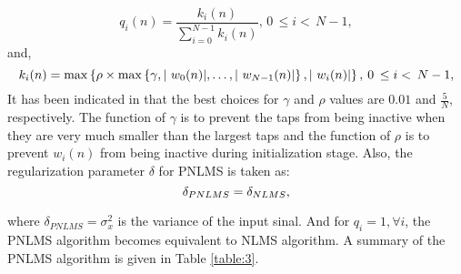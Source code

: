 \vspace{-1.5cm}
\begin{equation}
q_i(n)=\frac{k_{i}(n)}{\sum\limits_{i=0}^{N-1}k_{i}(n)}, \hspace{2pt}0\hspace{2pt}\leq i<\hspace{2pt}N-1, \label{eq12b}
\end{equation}
\noindent and,
\vspace{-0.6cm}
\begin{equation}
k_i(n)=\max\left\{\rho\times\max\left\{\gamma,|\ w_0(n)|,\ldots,|\ w_{N-1}(n)|\right\},|\ w_i(n)|\right\},\\
 \hspace{2pt}0\hspace{2pt}\leq i<\hspace{2pt}N-1, \label{eq13b}
\end{equation}
\noindent It has been indicated in \cite{Duttweiler} that the best choices for $\gamma$ and $\rho$ values are $0.01$ and $\frac{5}{N}$, respectively. The function of $\gamma$ is to prevent the taps from being inactive when they are very much smaller than the largest taps and the function of $\rho$ is to prevent $w_i(n)$ from being inactive during initialization stage. Also, the regularization parameter $\delta$ for PNLMS is taken as:
\vspace{-0.6cm}
 \begin{equation}
 \delta_{PNLMS}=\delta_{NLMS},\label{eg14b}\vspace{-0.6cm}
 \end{equation}

 \noindent where $\delta_{PNLMS}=\sigma_x^2$ is the variance of the input sinal. And for $q_{i}=1, \forall  i$, the PNLMS algorithm becomes equivalent to NLMS algorithm. A summary of the PNLMS algorithm is given in Table \ref{table:3}.

